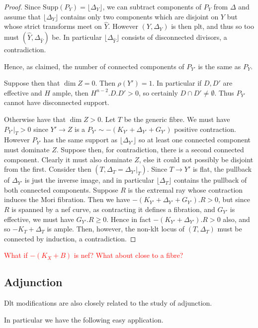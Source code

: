 \documentclass[a4paper,12pt]{book}
\newcommand{\D}{\Delta}
\newcommand\myworries[1]{\textcolor{red}{#1}}
\begin{document}
\begin{proof}
	Since $\text{Supp}(P_{Y})=\lfloor \D_{Y} \rfloor$, we can subtract components of $P_{Y}$ from $\Delta$ and assume that $\lfloor \D_{Y} \rfloor$ contains only two components which are disjoint on $Y$ but whose strict transforms meet on $\hat{Y}$. However $(Y,\Delta_{Y})$ is then plt, and thus so too must $(\hat{Y},\D_{\hat{Y}})$ be. In particular $\lfloor \D_{\hat{Y}} \rfloor$ consists of disconnected divisors, a contradiction.

	Hence, as claimed, the number of connected components of $P_{Y'}$ is the same as $P_{Y}$.
	
	Suppose then that $\dim Z=0$. Then $\rho(Y')=1$. In particular if $D,D'$ are effective and $H$ ample, then $H^{n-2}.D.D' >0$, so certainly $D\cap D' \neq \emptyset$. Thus $P_{Y'}$ cannot have disconnected support.
	
	Otherwise have that $\dim Z > 0 $. Let $T$ be the generic fibre. We must have $P_{Y'}|_{T}> 0$ since $Y' \to Z$ is a $P_{Y'}\sim -(K_{Y'}+\Delta_{Y'}+G_{Y'})$ positive contraction. However $P_{Y'}$ has the same support as $\lfloor \D_{Y'} \rfloor$ so at least one connected component must dominate $Z$. Suppose then, for contradiction, there is a second connected component. Clearly it must also dominate $Z$, else it could not possibly be disjoint from the first. Consider then $(T,\D_{T}=\D_{Y'}|_{T})$. Since $T \to Y'$ is flat, the pullback of $\D_{Y'}$ is just the inverse image, and in particular $\lfloor \D_{T} \rfloor$ contains the pullback of both connected components. Suppose $R$ is the extremal ray whose contraction induces the Mori fibration. Then we have $-(K_{Y'}+\D_{Y'}+G_{Y'}).R >0$, but since $R$ is spanned by a nef curve, as contracting it defines a fibration, and $G_{Y'}$ is effective, we must have $G_{Y'}.R \geq 0$. Hence in fact $-(K_{Y'}+\D_{Y'}).R >0$ also, and so $-K_{T}+\D_{T}$ is ample. Then, however, the non-klt locus of $(T,\D_{T})$ must be connected by induction, a contradiction.
\end{proof}


\myworries{What if $-(K_{X}+B)$ is nef? What about close to a fibre?}

\subsection{Adjunction}

Dlt modifications are also closely related to the study of adjunction.

In particular we have the following easy application.
\end{document}
